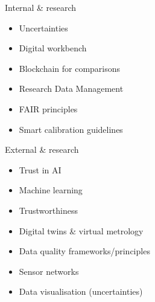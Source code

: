 \documentclass{beamer}
\newcommand{\highlight}[1]{{\color{red} #1}}
\begin{document}
\begin{frame}
\begin{columns}
\begin{column}{0.45\textwidth}
\begin{block}{Internal \& research}
\begin{itemize}
                        \item Uncertainties
                        \item Digital workbench
                        \item Blockchain for comparisons
                        \item \highlight{Research Data Management}
                        \item \highlight{FAIR principles}
                        \item Smart calibration guidelines
                    \end{itemize}
                \end{block}
                \begin{block}{External \& research}
                    \scriptsize
                    \begin{itemize}
                        \item Trust in AI
                        \item Machine learning
                        \item \highlight{Trustworthiness}
                        \item Digital twins \& virtual metrology
                        \item \highlight{Data quality frameworks/principles}
                        \item Sensor networks
                        \item Data visualisation (uncertainties)
                    \end{itemize}
                \end{block}
            \end{column}
        \end{columns}
    \end{frame}
\end{document}
